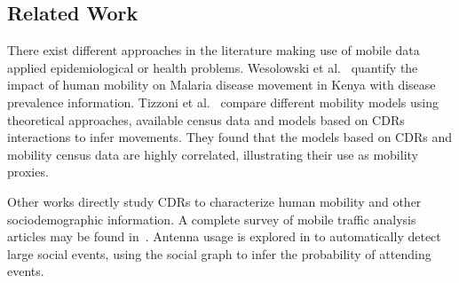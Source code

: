 
\subsection{Related Work}

There exist different approaches in the literature making use of mobile data applied epidemiological or health problems.
Wesolowski et al.~\cite{wesolowski2012quantifying} quantify the impact of human mobility on Malaria disease movement in Kenya with disease prevalence information.
Tizzoni et al.~\cite{tizzoni2014use} compare different mobility models using theoretical approaches, available census data and models based on CDRs interactions to infer movements. They found that the models based on CDRs and mobility census data are highly correlated, illustrating their use as mobility proxies.

Other works directly study CDRs to characterize human mobility and other
sociodemographic information. A complete survey of mobile traffic analysis articles may be found in~\cite{naboulsi2015mobile}. Antenna usage is explored in \cite{sarraute2015socialevents} to automatically detect large social events, using the social graph to infer the probability of attending events.
